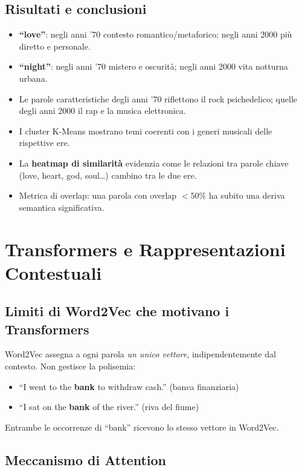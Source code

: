 \documentclass[12pt,a4paper]{article}
\begin{document}
\subsection{Risultati e conclusioni}

\begin{itemize}[leftmargin=1.5em]
  \item \textbf{``love''}: negli anni '70 contesto romantico/metaforico; negli anni 2000 più diretto e personale.
  \item \textbf{``night''}: negli anni '70 mistero e oscurità; negli anni 2000 vita notturna urbana.
  \item Le parole caratteristiche degli anni '70 riflettono il rock psichedelico; quelle degli anni 2000 il rap e la musica elettronica.
  \item I cluster K-Means mostrano temi coerenti con i generi musicali delle rispettive ere.
  \item La \textbf{heatmap di similarità} evidenzia come le relazioni tra parole chiave (love, heart, god, soul\ldots) cambino tra le due ere.
  \item Metrica di overlap: una parola con overlap $< 50\%$ ha subito una deriva semantica significativa.
\end{itemize}

\section{Transformers e Rappresentazioni Contestuali}

\subsection{Limiti di Word2Vec che motivano i Transformers}

Word2Vec assegna a ogni parola \emph{un unico vettore}, indipendentemente dal contesto. Non gestisce la polisemia:

\begin{itemize}[leftmargin=1.5em]
  \item ``I went to the \textbf{bank} to withdraw cash.'' (banca finanziaria)
  \item ``I sat on the \textbf{bank} of the river.'' (riva del fiume)
\end{itemize}

Entrambe le occorrenze di ``bank'' ricevono lo stesso vettore in Word2Vec.

\subsection{Meccanismo di Attention}
\end{document}
